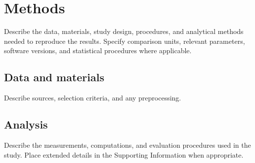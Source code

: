 \section{Methods}

Describe the data, materials, study design, procedures, and analytical methods
needed to reproduce the results. Specify comparison units, relevant parameters,
software versions, and statistical procedures where applicable.

\subsection{Data and materials}

Describe sources, selection criteria, and any preprocessing.

\subsection{Analysis}

Describe the measurements, computations, and evaluation procedures used in the
study. Place extended details in the Supporting Information when appropriate.

